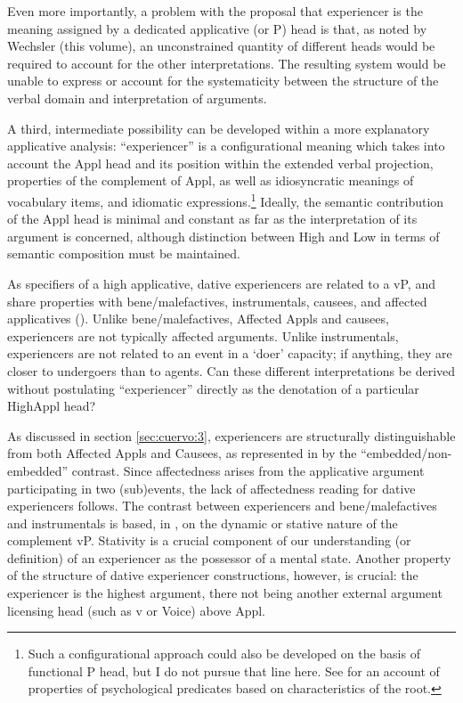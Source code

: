 \documentclass[output=paper,colorlinks,citecolor=brown,nonflat]{./langscibook}
\begin{document}
Even more importantly, a problem with the proposal that experiencer is the meaning assigned by a dedicated applicative (or P) head is that, as noted by Wechsler (this volume), an unconstrained quantity of different heads would be required to account for the other interpretations. The resulting system would be unable to express or account for the systematicity between the structure of the verbal domain and interpretation of arguments.   

A third, intermediate possibility can be developed within a more explanatory applicative analysis: “experiencer” is a configurational meaning which takes into account the Appl head and its position within the extended verbal projection, properties of the complement of Appl, as well as idiosyncratic meanings of vocabulary items, and idiomatic expressions.\footnote{Such a configurational approach could also be developed on the basis of  functional P head, but I do not pursue that line here. See \citet{Acedo-MatellánMateu2015} for an account of properties of psychological predicates based on characteristics of the root.}  Ideally, the semantic contribution of the Appl head is minimal and constant as far as the interpretation of its argument is concerned, although  distinction between High and Low in terms of semantic composition must be maintained.

As specifiers of a high applicative, dative experiencers are related to a vP, and share properties with bene/malefactives, instrumentals, causees, and affected applicatives (). Unlike bene/malefactives, Affected Appls and causees, experiencers are not typically affected arguments. Unlike instrumentals, experiencers are not related to an event in a ‘doer’ capacity; if anything, they are closer to undergoers than to agents. Can these different interpretations be derived without postulating “experiencer” directly as the denotation of a particular HighAppl head?

As discussed in section \ref{sec:cuervo:3}, experiencers are structurally distinguishable from both Affected Appls and Causees, as represented in  by the “embedded/non-embedded” contrast. Since affectedness arises from the applicative argument participating in two (sub)events, the lack of affectedness reading for dative experiencers follows. The contrast between experiencers and bene/malefactives and instrumentals is based, in , on the dynamic or stative nature of the complement vP. Stativity is a crucial component of our understanding (or definition) of an experiencer as the possessor of a mental state. Another property of the structure of dative experiencer constructions, however, is crucial: the experiencer is the highest argument, there not being another external argument licensing head (such as v or Voice) above Appl. 
\end{document}
